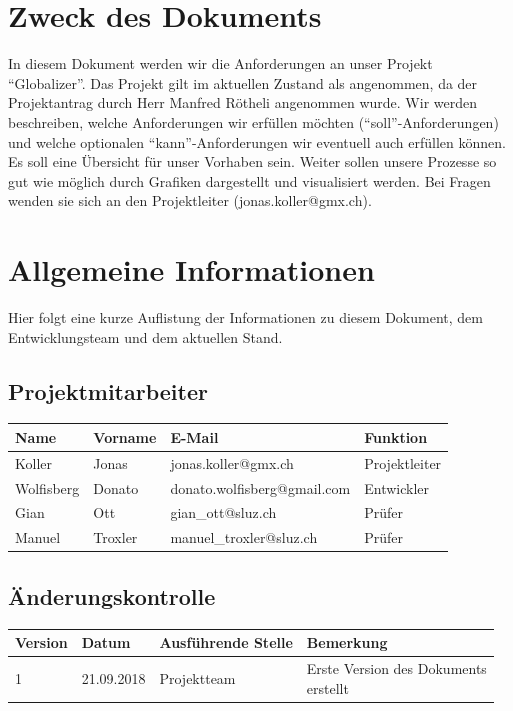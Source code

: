 \documentclass[12pt]{article}
\begin{document}
  \section{Zweck des Dokuments}
    In diesem Dokument werden wir die Anforderungen an unser Projekt “Globalizer”.
    Das Projekt gilt im aktuellen Zustand als angenommen,
    da der Projektantrag durch Herr Manfred Rötheli angenommen wurde. Wir werden be\-schreiben,
    welche Anforderungen wir erfüllen möchten (“soll”-Anforderungen) und welche optionalen
    “kann”-Anforderungen wir eventuell auch erfüllen können.
    Es soll eine Übersicht für unser Vorhaben sein. Weiter sollen unsere Prozesse
    so gut wie möglich durch Grafiken dargestellt und visualisiert werden.
    Bei Fragen wenden sie sich an den Projektleiter (jonas.koller@gmx.ch).

  \section{Allgemeine Informationen}
    Hier folgt eine kurze Auflistung der Informationen zu diesem Dokument,
    dem Entwicklungsteam und dem aktuellen Stand.

  \subsection{Projektmitarbeiter}
    \begin{table}[h]
      \begin{tabularx}{\textwidth}{|l|l|X|l|}
        \hline
        \textbf{Name} & \textbf{Vorname}  & \textbf{E-Mail}                & \textbf{Funktion}     \\ \hline
        Koller        & Jonas             & jonas.koller@gmx.ch            & Projektleiter         \\ \hline
        Wolfisberg    & Donato            & donato.wolfisberg@gmail.com    & Entwickler            \\ \hline
        Gian          & Ott               & gian\_ott@sluz.ch              & Prüfer                \\ \hline
        Manuel        & Troxler           & manuel\_troxler@sluz.ch        & Prüfer                \\ \hline
      \end{tabularx}%
    \end{table}

  \subsection{Änderungskontrolle}
    \begin{table}[h]
      \begin{tabularx}{\textwidth}{|l|l|l|X|}
        \hline
        \textbf{Version} & \textbf{Datum} & \textbf{Ausführende Stelle} & \textbf{Bemerkung}                     \\ \hline
        1                & 21.09.2018     & Projektteam                 & \makecell[l]{Erste Version des Dokuments \\ erstellt}  \\ \hline
      \end{tabularx}
    \end{table}
\end{document}
